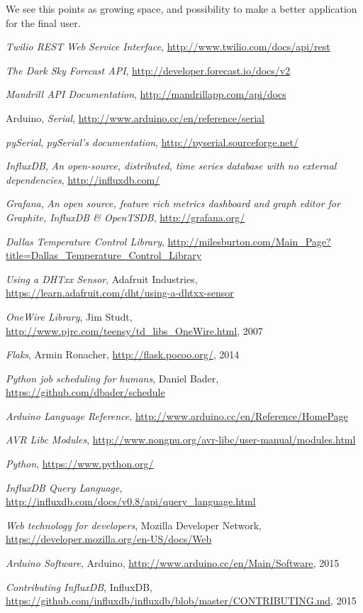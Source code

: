 \documentclass[12pt]{report}
\begin{document}
We see this points as growing space, and possibility to make a better application for the final user.

\renewcommand\bibname{References}
\begin{thebibliography}{}

  \emph{Twilio REST Web Service Interface},
  \url{http://www.twilio.com/docs/api/rest}
  
  \emph{The Dark Sky Forecast API},
  \url{http://developer.forecast.io/docs/v2}
  
  \emph{Mandrill API Documentation},
  \url{http://mandrillapp.com/api/docs}
  
  Arduino, \emph{Serial},
  \url{http://www.arduino.cc/en/reference/serial}
  
  \textit{pySerial}, \emph{pySerial’s documentation},
  \url{http://pyserial.sourceforge.net/}
  
  \textit{InfluxDB}, \emph{An open-source, distributed, time series database
with no external dependencies},
  \url{http://influxdb.com/}
  
  \textit{Grafana}, \emph{An open source, feature rich metrics dashboard and graph editor for
Graphite, InfluxDB \& OpenTSDB},
  \url{http://grafana.org/}
  
  \textit{Dallas Temperature Control Library},
  \url{http://milesburton.com/Main_Page?title=Dallas_Temperature_Control_Library}
  
  \textit{Using a DHTxx Sensor}, Adafruit Industries,
  \url{https://learn.adafruit.com/dht/using-a-dhtxx-sensor}
  
  \textit{OneWire Library}, Jim Studt,
  \url{http://www.pjrc.com/teensy/td_libs_OneWire.html}, 2007
  
  \textit{Flaks}, Armin Ronacher,
  \url{http://flask.pocoo.org/}, 2014

  \textit{Python job scheduling for humans}, Daniel Bader,
  \url{https://github.com/dbader/schedule}
  
  \textit{Arduino Language Reference},
  \url{http://www.arduino.cc/en/Reference/HomePage}
  
  \textit{AVR Libc Modules},
  \url{http://www.nongnu.org/avr-libc/user-manual/modules.html}
  
  \textit{Python},
  \url{https://www.python.org/}
  
  \textit{InfluxDB Query Language},
  \url{http://influxdb.com/docs/v0.8/api/query_language.html}
  
  \textit{Web technology for developers}, Mozilla Developer Network,
  \url{https://developer.mozilla.org/en-US/docs/Web}
  
  \textit{Arduino Software}, Arduino,
  \url{http://www.arduino.cc/en/Main/Software}, 2015
 
  \textit{Contributing InfluxDB}, InfluxDB,
  \url{https://github.com/influxdb/influxdb/blob/master/CONTRIBUTING.md}, 2015
\end{thebibliography}
\end{document}
